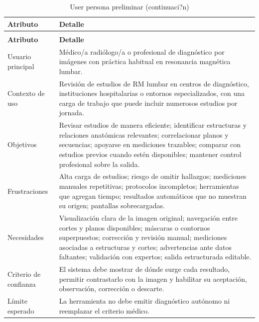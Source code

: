{\small
\setlength{\LTleft}{0pt}
\setlength{\LTright}{0pt}
\renewcommand{\arraystretch}{1.18}
\begin{longtable}{p{} p{}}
\caption{User persona preliminar}\label{tab:user-persona}\\
\hline
\textbf{Atributo} & \textbf{Detalle} \\
\hline
\endfirsthead
\caption[]{User persona preliminar (continuaci?n)}\\
\hline
\textbf{Atributo} & \textbf{Detalle} \\
\hline
\endhead
\hline
\endfoot
Usuario principal & Médico/a radiólogo/a o profesional de diagnóstico por imágenes con práctica habitual en resonancia magnética lumbar. \\
Contexto de uso & Revisión de estudios de RM lumbar en centros de diagnóstico, instituciones hospitalarias o entornos especializados, con una carga de trabajo que puede incluir numerosos estudios por jornada. \\
Objetivos & Revisar estudios de manera eficiente; identificar estructuras y relaciones anatómicas relevantes; correlacionar planos y secuencias; apoyarse en mediciones trazables; comparar con estudios previos cuando estén disponibles; mantener control profesional sobre la salida. \\
Frustraciones & Alta carga de estudios; riesgo de omitir hallazgos; mediciones manuales repetitivas; protocolos incompletos; herramientas que agregan tiempo; resultados automáticos que no muestran su origen; pantallas sobrecargadas. \\
Necesidades & Visualización clara de la imagen original; navegación entre cortes y planos disponibles; máscaras o contornos superpuestos; corrección y revisión manual; mediciones asociadas a estructuras y cortes; advertencias ante datos faltantes; validación con expertos; salida estructurada editable. \\
Criterio de confianza & El sistema debe mostrar de dónde surge cada resultado, permitir contrastarlo con la imagen y habilitar su aceptación, observación, corrección o descarte. \\
Límite esperado & La herramienta no debe emitir diagnóstico autónomo ni reemplazar el criterio médico. \\
\hline
\end{longtable}
}

